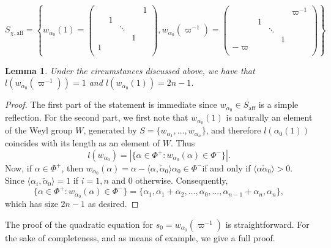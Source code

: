 \documentclass{article}
\newcommand{\aff}{\mathrm{aff}}
\newcommand{\calpha}{\check{\alpha}}
\theoremstyle{plain}
\newtheorem{lemma}[theorem]{Lemma}
\theoremstyle{definition}
\begin{document}
    \begin{equation*}
        S_{\chi,\aff}=\left\{w_{\alpha_0}(1)=\begin{pmatrix}
            &&&&1\\
            &1&&&\\
            &&\ddots&&\\
            &&&1&\\
            1&&&&\\
        \end{pmatrix}, w_{\alpha_0}(\varpi^{-1})=\begin{pmatrix}
            &&&&\varpi^{-1}\\
            &1&&&\\
            &&\ddots&&\\
            &&&1&\\
            -\varpi&&&&\\
        \end{pmatrix}\right\}
    \end{equation*}

    \begin{lemma}\label{lem_length}
        Under the circumstances discussed above, we have that $l(w_{\alpha_0}(\varpi^{-1}))=1$ and $l(w_{\alpha_0}(1))=2n-1$.
    \end{lemma}
    \begin{proof}
        The first part of the statement is immediate since $w_{\alpha_0}\in S_{\aff}$ is a simple reflection. For the second part, we first note that $w_{\alpha_0}(1)$ is naturally an element of the Weyl group $W$, generated by $S=\{w_{\alpha_1},\ldots,w_{\alpha_n}\}$, and therefore $l(\alpha_0(1))$ coincides with its length as an element of $W$. Thus
        $$l(w_{\alpha_0})=|\{\alpha\in\Phi^+:w_{\alpha_0}(\alpha)\in\Phi^-\}|.$$
        Now, if $\alpha\in\Phi^+$, then $w_{\alpha_0}(\alpha)=\alpha-\langle\alpha,\calpha_0\rangle\alpha_0\in\Phi^-$if and only if $\langle\alpha\calpha_0\rangle>0$. Since $\langle\alpha_i,\calpha_0\rangle=1$ if $i=1,n$ and $0$ otherwise. Consequently, 
        $$\{\alpha\in\Phi^+:w_{\alpha_0}(\alpha)\in\Phi^-\}=\{\alpha_1,\alpha_1+\alpha_2,\ldots,\alpha_0,\ldots,\alpha_{n-1}+\alpha_n,\alpha_n\},$$
        which has size $2n-1$ as desired.
    \end{proof}

    The proof of the quadratic equation for $s_0=w_{\alpha_0}(\varpi^{-1})$ is straightforward. For the sake of completeness, and as means of example, we give a full proof.
    
\end{document}
